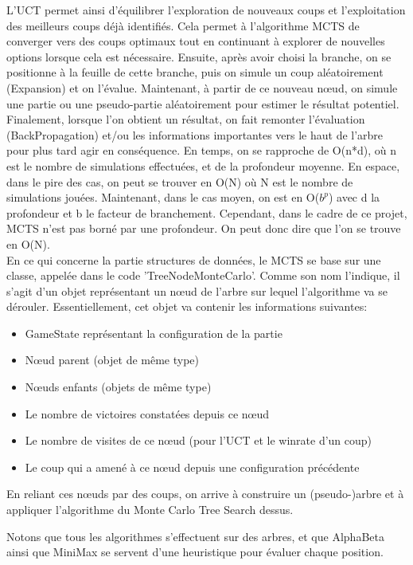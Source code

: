 \documentclass{article}
\begin{document}
\begin{itemize}
    L’UCT permet ainsi d’équilibrer l’exploration de nouveaux coups et l’exploitation des meilleurs coups déjà identifiés.
    Cela permet à l’algorithme MCTS de converger vers des coups optimaux tout en continuant à explorer de nouvelles options lorsque cela est nécessaire.
    Ensuite, après avoir choisi la branche, on se positionne à la feuille de cette branche,
    puis on simule un coup aléatoirement (Expansion) et on l'évalue. Maintenant, à partir de ce nouveau nœud, on simule une partie ou une pseudo-partie
    aléatoirement pour estimer le résultat potentiel. Finalement, lorsque l'on obtient un résultat, on fait remonter l'évaluation (BackPropagation)
    et/ou les informations importantes vers le haut de l'arbre pour plus tard agir en conséquence. En temps, on se rapproche de O(n*d), où n est le
    nombre de simulations effectuées, et de la profondeur moyenne. En espace, dans le pire des cas, on peut se trouver en O(N) où N est le nombre
    de simulations jouées. Maintenant, dans le cas moyen, on est en O($b^p$) avec d la profondeur et b le facteur de branchement.
    Cependant, dans le cadre de ce projet, MCTS n'est pas borné par une profondeur. On peut donc dire que l'on se trouve en O(N).\\
    En ce qui concerne la partie structures de données, le MCTS se base sur une classe, appelée dans le code 'TreeNodeMonteCarlo'.
    Comme son nom l'indique, il s'agit d'un objet représentant un nœud de l'arbre sur lequel l'algorithme va se dérouler.
    Essentiellement, cet objet va contenir les informations suivantes:
    \begin{itemize}
        \item GameState représentant la configuration de la partie
        \item Nœud parent (objet de même type)
        \item Nœuds enfants (objets de même type)
        \item Le nombre de victoires constatées depuis ce nœud
        \item Le nombre de visites de ce nœud (pour l'UCT et le winrate d'un coup)
        \item Le coup qui a amené à ce nœud depuis une configuration précédente
    \end{itemize}
    En reliant ces nœuds par des coups, on arrive à construire un (pseudo-)arbre et à appliquer l'algorithme du Monte Carlo Tree Search dessus.
\end{itemize}

Notons que tous les algorithmes s'effectuent sur des arbres, et que AlphaBeta ainsi que MiniMax se servent d'une heuristique pour évaluer chaque position.
\end{document}
